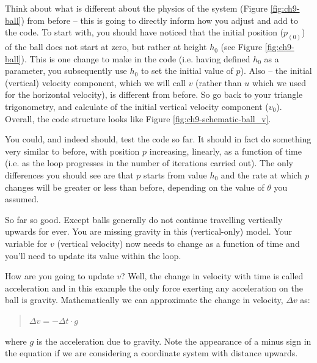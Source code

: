 \documentclass{tufte-book} %
\newenvironment{docspec}{\begin{quotation}\ttfamily\parskip0pt\parindent0pt\ignorespaces}{\end{quotation}}
\begin{document}
Think about what is different about the physics of the system (Figure \ref{fig:ch9-ball}) from before -- this is going to directly inform how you adjust and add to the code. To start with, you should have noticed that the initial position (\(p_{(0)}\)) of the ball does not start at zero, but rather at height \(h_{0}\) (see Figure \ref{fig:ch9-ball}). This is one change to make in the code (i.e. having defined \(h_{0}\) as a parameter, you subsequently use \(h_{0}\) to set the initial value of \(p\)). Also -- the initial (vertical) velocity component, which we will call \(v\) (rather than \(u\) which we used for the horizontal velocity), is different from before. So go back to your triangle trigonometry,  and calculate of the initial vertical velocity component (\(v_{0}\)). Overall, the code structure looks like Figure \ref{fig:ch9-schematic-ball_v}.

You could, and indeed should, test the code so far. It should in fact do something very similar to before, with position \(p\) increasing, linearly, as a function of time (i.e. as the loop progresses in the number of iterations carried out). The only differences you should see are that \(p\) starts from value \(h_{0}\) and the rate at which \(p\) changes will be greater or less than before, depending on the value of \(\theta\) you assumed.

So far so good. Except balls generally do not continue travelling vertically upwards for ever. You are missing gravity in this (vertical-only) model. Your variable for \(v\) (vertical velocity) now needs to change as a function of time and you'll need to update its value within the loop.

How are you going to update \(v\)? Well, the change in velocity with time is called acceleration and in this example the only force exerting any acceleration on the ball is gravity. Mathematically we can approximate the change in velocity, \(\Delta v\) as:
\begin{docspec}
\(\Delta v=-\Delta t\cdot g\)
\end{docspec}
where \(g\) is the acceleration due to gravity. Note the appearance of a minus sign in the equation if we are considering a coordinate system with distance upwards.
\end{document}
